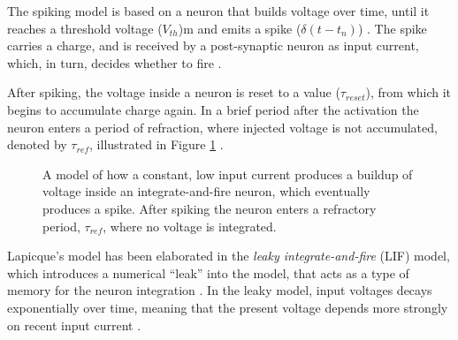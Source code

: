 \documentclass[report.tex]{subfiles}
\begin{document}
The spiking model is based on a neuron that builds voltage over time, until
it reaches a threshold voltage ($V_{th}$)m and emits a spike
\mbox{($\delta(t-t_n)$)}
\cite{Dayan2001, Eliasmith2004}.
The spike carries a charge, and is received by a post-synaptic neuron as
input current, which, in turn, decides whether to fire \cite{Dayan2001}.

After spiking, the voltage inside a neuron is reset to a value ($\tau_{reset}$),
from which it begins to accumulate charge again.
In a brief period after the activation the neuron enters a period of
refraction, 
where injected voltage is not accumulated, denoted by 
$\tau_{ref}$, illustrated in Figure \ref{fig:spiking}
\cite[p. 82]{Eliasmith2004}.

\begin{figure}
\centering

\caption{A model of how a constant, low input current produces a buildup of
	voltage inside an integrate-and-fire neuron, which eventually produces a spike.
	After spiking the neuron enters a refractory period, $\tau_{ref}$,
   	where no voltage is integrated.}
\label{fig:spiking}
\end{figure}

Lapicque's model has been elaborated in the \textit{leaky
integrate-and-fire} (LIF) 
model, which introduces a numerical ``leak''
into the model, that acts as a type of memory 
for the neuron integration \cite{Eliasmith2004, Eliasmith2015}.
In the leaky model, input voltages decays exponentially over time,
meaning that the present voltage depends more strongly on recent input
current \cite[p. 85]{Eliasmith2004}.
\end{document}

